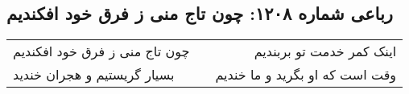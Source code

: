 \begin{center}
\section*{رباعی شماره ۱۲۰۸: چون تاج منی ز فرق خود افکندیم}
\label{sec:1208}
\begin{longtable}{l p{0.5cm} r}
چون تاج منی ز فرق خود افکندیم
&&
اینک کمر خدمت تو بربندیم
\\
بسیار گریستیم و هجران خندید
&&
وقت است که او بگرید و ما خندیم
\\
\end{longtable}
\end{center}

